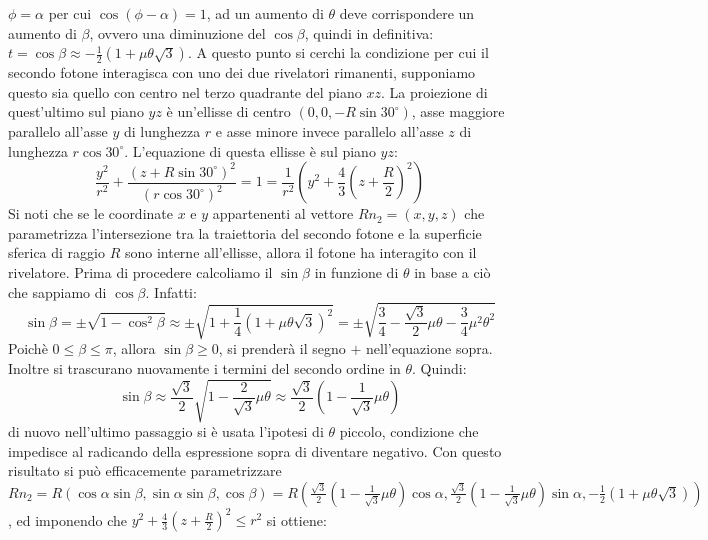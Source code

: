   \( \phi = \alpha \) per cui \(\cos \left( \phi - \alpha \right) = 1\), ad un aumento di \(\theta\) deve corrispondere un aumento di \(\beta\), ovvero una diminuzione del \(\cos \beta\),
  quindi in definitiva: \(t= \cos \beta \approx -\frac{1}{2} \left( 1 + \mu \theta \sqrt{3} \right) \).
  A questo punto si cerchi la condizione per cui il secondo fotone interagisca con uno dei due rivelatori rimanenti, supponiamo questo sia quello con centro nel terzo quadrante
  del piano \(xz\). La proiezione di quest'ultimo sul piano \(yz\) è un'ellisse di centro \(\left(0,0,-R \sin 30^\circ \right)\), asse maggiore parallelo all'asse \(y\) di lunghezza \(r\) e asse minore invece parallelo
  all'asse \(z\) di lunghezza \(r \cos 30^\circ\). L'equazione di questa ellisse è sul piano \(yz\):
  $$ \frac{y^2}{r^2} + \frac{\left( z + R \sin 30^\circ \right)^2}{\left(r \cos 30^\circ\right)^2} = 1 = \frac{1}{r^2}\left(y^2 + \frac{4}{3} \left( z + \frac{R}{2} \right)^2 \right) $$
  Si noti che se le coordinate \(x\) e \(y\) appartenenti al vettore \(R n_2 = \left( x, y, z \right)\) che parametrizza l'intersezione tra la traiettoria del secondo fotone e la 
  superficie sferica di raggio \(R\) sono interne all'ellisse, allora il fotone ha interagito con il rivelatore. Prima di procedere calcoliamo il \(\sin \beta \) in funzione di $\theta$ in base a
  ciò che sappiamo di \(\cos \beta\). Infatti: 
  $$ \sin \beta = \pm \sqrt{1 - \cos^2 \beta} \approx \pm \sqrt{1 + \frac{1}{4} \left( 1 + \mu \theta \sqrt{3} \right)^2 } = \pm \sqrt{\frac{3}{4} - \frac{\sqrt{3}}{2} \mu \theta - \frac{3}{4} \mu^2 \theta^2 }  $$
  Poichè \(0 \le \beta \le \pi\), allora \(\sin \beta \ge 0\), si prenderà il segno \(+\) nell'equazione sopra. Inoltre si trascurano nuovamente i termini del secondo ordine in \(\theta\).
  Quindi:
  $$ \sin \beta \approx \frac{\sqrt{3}}{2} \sqrt {1 - \frac{2}{\sqrt{3}} \mu \theta} \approx \frac{\sqrt{3}}{2} \left(1 - \frac{1}{\sqrt{3}} \mu \theta \right)  $$
  di nuovo nell'ultimo passaggio si è usata l'ipotesi di \(\theta\) piccolo, condizione che impedisce al radicando della espressione sopra di diventare negativo.
  Con questo risultato si può efficacemente parametrizzare \(R n_2 = R \left( \cos \alpha \sin \beta , \sin \alpha \sin \beta, \cos \beta  \right) = 
  R \left( \frac{\sqrt{3}}{2} \left(1 - \frac{1}{\sqrt{3}} \mu \theta \right) \cos \alpha , \frac{\sqrt{3}}{2} \left(1 - \frac{1}{\sqrt{3}} \mu \theta \right) \sin \alpha ,
  -\frac{1}{2} \left( 1 + \mu \theta \sqrt{3} \right) \right)\), ed imponendo che \(y^2 + \frac{4}{3} \left( z + \frac{R}{2} \right)^2 \le r^2 \) si ottiene:
